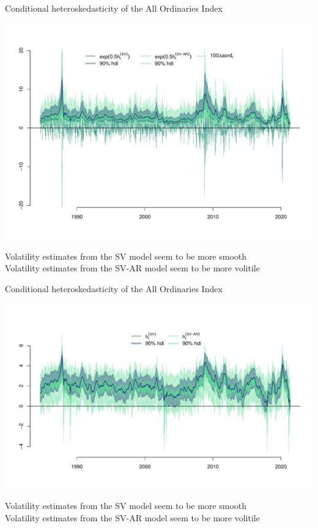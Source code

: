 \documentclass[notes,blackandwhite,mathsans,usenames,dvipsnames]{beamer}
\begin{document}
\begin{frame}{Conditional heteroskedasticity of the All Ordinaries Index}
\begin{center}
\includegraphics[scale=0.48, trim=1.5cm 2cm 0cm 3.1cm]{sv-hdi.pdf}

\bigskip\small{\color{mcxs2}Volatility estimates from the SV model seem to be more smooth\\ Volatility estimates from the SV-AR model seem to be more volitile }
\end{center}
\end{frame}



\begin{frame}{Conditional heteroskedasticity of the All Ordinaries Index}
\begin{center}
\includegraphics[scale=0.48, trim=1.5cm 1cm 0cm 3.1cm]{sv-ht.pdf}

\bigskip\small{\color{mcxs2}Volatility estimates from the SV model seem to be more smooth\\ Volatility estimates from the SV-AR model seem to be more volitile }
\end{center}
\end{frame}
\end{document}

